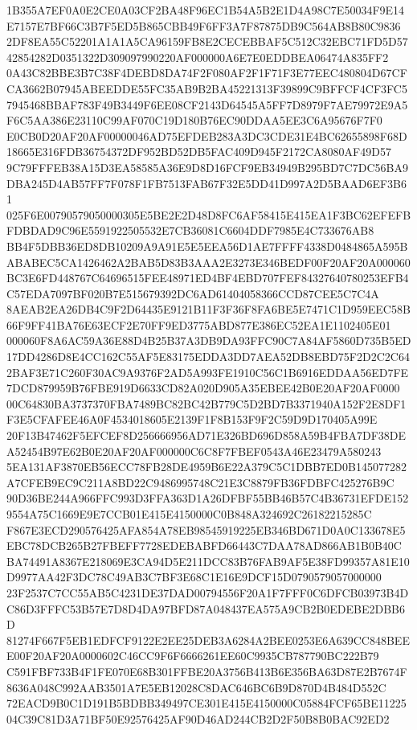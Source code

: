 \documentclass[UTF8,fontset=fandol,zihao=-4,a4paper]{ctexart}
\begin{document}
{{1B355A7EF0A0E2CE0A03CF2BA48F96EC1B54A5B2E1D4A98C7E50034F9E14E7157E7BF66C3B7F5ED5B865CBB49F6FF3A7F87875DB9C564AB8B80C9836
2DF8EA55C52201A1A1A5CA96159FB8E2CECEBBAF5C512C32EBC71FD5D5742854282D0351322D309097990220AF000000A6E7E0EDDBEA06474A835FF2
0A43C82BBE3B7C38F4DEBD8DA74F2F080AF2F1F71F3E77EEC480804D67CFCA3662B07945ABEEDDE55FC35AB9B2BA45221313F39899C9BFFCF4CF3FC5
7945468BBAF783F49B3449F6EE08CF2143D64545A5FF7D8979F7AE79972E9A5F6C5AA386E23110C99AF070C19D180B76EC90DDAA5EE3C6A95676F7F0
E0CB0D20AF20AF00000046AD75EFDEB283A3DC3CDE31E4BC62655898F68D18665E316FDB36754372DF952BD52DB5FAC409D945F2172CA8080AF49D57
9C79FFFEB38A15D3EA58585A36E9D8D16FCF9EB34949B295BD7C7DC56BA9DBA245D4AB57FF7F078F1FB7513FAB67F32E5DD41D997A2D5BAAD6EF3B61
025F6E00790579050000305E5BE2E2D48D8FC6AF58415E415EA1F3BC62EFEFBFDBDAD9C96E5591922505532E7CB36081C6604DDF7985E4C733676AB8
BB4F5DBB36ED8DB10209A9A91E5E5EEA56D1AE7FFFF4338D0484865A595BABABEC5CA1426462A2BAB5D83B3AAA2E3273E346BEDF00F20AF20A000060
BC3E6FD448767C64696515FEE48971ED4BF4EBD707FEF84327640780253EFB4C57EDA7097BF020B7E515679392DC6AD61404058366CCD87CEE5C7C4A
8AEAB2EA26DB4C9F2D64435E9121B11F3F36F8FA6BE5E7471C1D959EEC58B66F9FF41BA76E63ECF2E70FF9ED3775ABD877E386EC52EA1E1102405E01
000060F8A6AC59A36E88D4B25B37A3DB9DA93FFC90C7A84AF5860D735B5ED17DD4286D8E4CC162C55AF5E83175EDDA3DD7AEA52DB8EBD75F2D2C2C64
2BAF3E71C260F30AC9A9376F2AD5A993FE1910C56C1B6916EDDAA56ED7FE7DCD879959B76FBE919D6633CD82A020D905A35EBEE42B0E20AF20AF0000
00C64830BA3737370FBA7489BC82BC42B779C5D2BD7B3371940A152F2E8DF1F3E5CFAFEE46A0F4534018605E2139F1F8B153F9F2C59D9D170405A99E
20F13B47462F5EFCEF8D256666956AD71E326BD696D858A59B4FBA7DF38DEA52454B97E62B0E20AF20AF000000C6C8F7FBEF0543A46E23479A580243
5EA131AF3870EB56ECC78FB28DE4959B6E22A379C5C1DBB7ED0B145077282A7CFEB9EC9C211A8BD22C9486995748C21E3C8879FB36FDBFC425276B9C
90D36BE244A966FFC993D3FFA363D1A26DFBF55BB46B57C4B36731EFDE1529554A75C1669E9E7CCB01E415E4150000C0B848A324692C26182215285C
F867E3ECD290576425AFA854A78EB98545919225EB346BD671D0A0C133678E5EBC78DCB265B27FBEFF7728EDEBABFD66443C7DAA78AD866AB1B0B40C
BA74491A8367E218069E3CA94D5E211DCC83B76FAB9AF5E38FD99357A81E10D9977AA42F3DC78C49AB3C7BF3E68C1E16E9DCF15D0790579057000000
23F2537C7CC55AB5C4231DE37DAD00794556F20A1F7FFF0C6DFCB03973B4DC86D3FFFC53B57E7D8D4DA97BFD87A048437EA575A9CB2B0EDEBE2DBB6D
81274F667F5EB1EDFCF9122E2EE25DEB3A6284A2BEE0253E6A639CC848BEEE00F20AF20A0000602C46CC9F6F6666261EE60C9935CB787790BC222B79
C591FBF733B4F1FE070E68B301FFBE20A3756B413B6E356BA63D87E2B7674F8636A048C992AAB3501A7E5EB12028C8DAC646BC6B9D870D4B484D552C
72EACD9B0C1D191B5BDBB349497CE301E415E4150000C05884FCF65BE1122504C39C81D3A71BF50E92576425AF90D46AD244CB2D2F50B8B0BAC92ED2
}}
\end{document}
